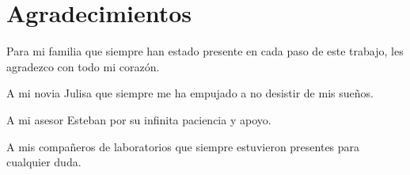 \chapter{Agradecimientos}

    Para mi familia que siempre han estado presente en cada paso de este trabajo, les agradezco con todo mi corazón. 

    A mi novia Julisa que siempre me ha empujado a no desistir de mis sueños.

    A mi asesor Esteban por su infinita paciencia y apoyo.

    A mis compañeros de laboratorios que siempre estuvieron presentes para cualquier duda.
